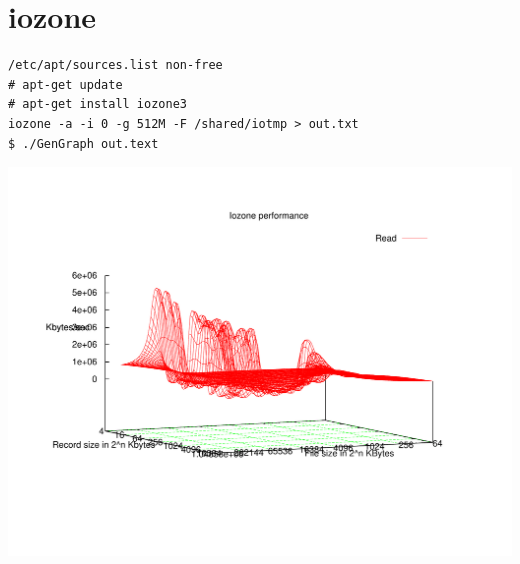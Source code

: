 \section{iozone}
\begin{lstlisting}[style=Bash]
/etc/apt/sources.list non-free
# apt-get update
# apt-get install iozone3
iozone -a -i 0 -g 512M -F /shared/iotmp > out.txt
$ ./GenGraph out.text
\end{lstlisting}
\includegraphics[scale=0.7]{read.pdf}
